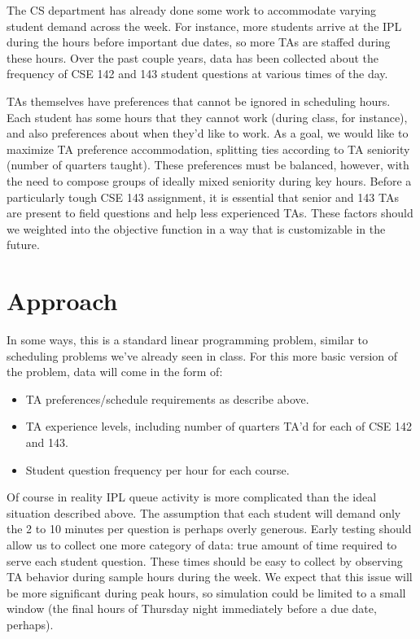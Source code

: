 \documentclass{article}
\begin{document}
\begin{multicols}{2}
The CS department has already done some work to accommodate varying student demand across the week. For instance, more students arrive at the IPL during the hours before important due dates, so more TAs are staffed during these hours. Over the past couple years, data has been collected about the frequency of CSE 142 and 143 student questions at various times of the day.

TAs themselves have preferences that cannot be ignored in scheduling hours. Each student has some hours that they cannot work (during class, for instance), and also preferences about when they'd like to work. As a goal, we would like to maximize TA preference accommodation, splitting ties according to TA seniority (number of quarters taught). These preferences must be balanced, however, with the need to compose groups of ideally mixed seniority during key hours. Before a particularly tough CSE 143 assignment, it is essential that senior and 143 TAs are present to field questions and help less experienced TAs. These factors should we weighted into the objective function in a way that is customizable in the future.

\section*{Approach}
In some ways, this is a standard linear programming problem, similar to scheduling problems we've already seen in class. For this more basic version of the problem, data will come in the form of:
\begin{itemize}
    \item TA preferences/schedule requirements as describe above.
    \item TA experience levels, including number of quarters TA'd for each of CSE 142 and 143.
    \item Student question frequency per hour for each course.
\end{itemize}

Of course in reality IPL queue activity is more complicated than the ideal situation described above. The assumption that each student will demand only the 2 to 10 minutes per question is perhaps overly generous. Early testing should allow us to collect one more category of data: true amount of time required to serve each student question. These times should be easy to collect by observing TA behavior during sample hours during the week. We expect that this issue will be more significant during peak hours, so simulation could be limited to a small window (the final hours of Thursday night immediately before a due date, perhaps).


\end{multicols}
\end{document}
